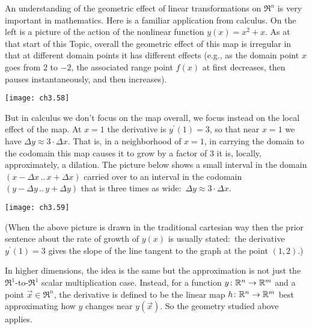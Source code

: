 An understanding of the geometric effect of linear transformations 
on $\Re^n$ is very important in mathematics. 
Here is a familiar application from calculus.
On the left is a picture
of the action of the nonlinear function \( y(x)=x^2+x \).
As at that start of this Topic, overall the geometric effect of this map is
irregular in that at different domain points it has different effects
(e.g., as the domain point $x$ goes from $2$ to $-2$, the associated range
point $f(x)$ at first decreases, then pauses instantaneously,
and then increases).
\begin{center}
  \texttt{[image: ch3.58]}
\end{center}
But in calculus we don't focus on the map overall, 
we focus instead on the local effect of the map.
At $x=1$ the derivative is \( y^\prime(1)=3 \),
so that near \( x=1 \) 
we have \( \Delta y\approx 3\cdot\Delta x \).
That is, in a neighborhood of $x=1$,
in carrying the domain to the codomain this map causes it to grow by
a factor of $3$ \Dash  it is, locally, 
approximately, a dilation.
The picture below shows a small interval 
in the domain $(x-\Delta x\,..\,x+\Delta x)$
carried over to an interval in the codomain $(y-\Delta y\,..\,y+\Delta y)$
that is three times as wide:~$\Delta y \approx 3\cdot \Delta x$.
\begin{center}
  \texttt{[image: ch3.59]}
\end{center}
(When the above picture is drawn in the traditional cartesian way
then the prior sentence about the rate of growth of $y(x)$ is usually
stated:~the derivative $y^\prime(1)=3$ gives the slope of the 
line tangent to the graph at the point $(1,2)$.)

In higher dimensions, the idea is the same but the approximation
is not just the $\Re^1$-to-$\Re^1$ scalar multiplication case.
Instead, for 
a function \( \mbox{$y\colon \mathbb{R}^n\to \mathbb{R}^m$} \) and a point \( \vec{x}\in\Re^n \),
the derivative is defined to be the 
linear map \( \mbox{$h\colon \mathbb{R}^n\to \mathbb{R}^m$} \) best approximating
how \( y \) changes near \( y(\vec{x}) \).
So the geometry studied above applies.

